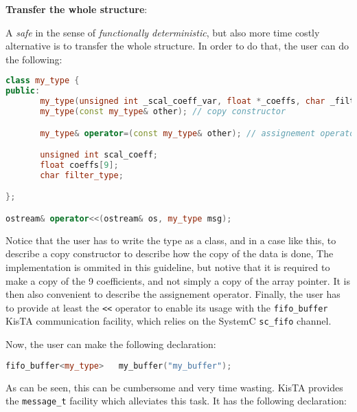 \textbf{Transfer the whole structure}:

A \emph{safe} in the sense of \emph{functionally deterministic}, but also more time costly alternative is to transfer the whole structure. In order to do that, the user can do the following:

\begin{lstlisting}[language=c++,caption={Example of complex data structure declared by the user.},label=user_type_complex_struct_code]
class my_type {
public:
       my_type(unsigned int _scal_coeff_var, float *_coeffs, char _filter_type );
       my_type(const my_type& other); // copy constructor

       my_type& operator=(const my_type& other); // assignement operator

       unsigned int scal_coeff;
       float coeffs[9];
       char filter_type;

};

ostream& operator<<(ostream& os, my_type msg);
\end{lstlisting}

Notice that the user has to write the type as a class, and in a case like this, to describe a copy constructor to describe how the copy of the data is done, The implementation is ommited in this guideline, but notive that it is required to make a copy of the 9 coefficients, and not simply a copy of the array pointer. It is then also convenient to describe the assignement operator. Finally, the user has to provide at least the {\tt <<} operator to enable its usage with the {\tt fifo\_buffer} KisTA communication facility, which relies on the SystemC {\tt sc\_fifo} channel.

Now, the user can make the following declaration:

\begin{lstlisting}[language=c++,caption={Declaration of a  KisTA fifo buffer transferring a user class by value.}]
fifo_buffer<my_type>   my_buffer("my_buffer");
\end{lstlisting}

As can be seen, this can be cumbersome and very time wasting. KisTA provides the \texttt{message\_t} facility which alleviates this task. It has the following declaration:


